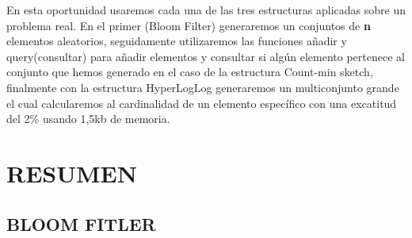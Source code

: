 \documentclass[journal]{IEEEtran}
\begin{document}
En esta oportunidad usaremos cada una de las tres estructuras aplicadas sobre un problema real. En el primer (Bloom Filter) generaremos un conjuntos de \textbf{n} elementos aleatorios, seguidamente utilizaremos las funciones añadir y query(consultar) para añadir elementos y consultar si algún elemento pertenece al conjunto que hemos generado en el caso de la estructura Count-min sketch, finalmente con la estructura HyperLogLog generaremos un multiconjunto grande el cual calcularemos al cardinalidad de un elemento específico con una excatitud del 2\% usando 1,5kb de memoria.

\section{RESUMEN}
\subsection{BLOOM FITLER}
\end{document}
